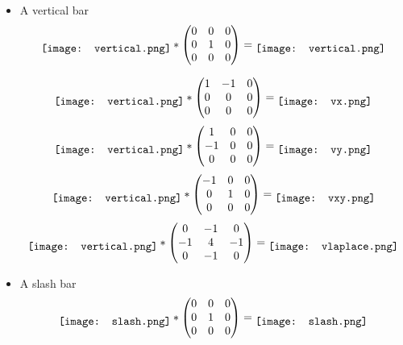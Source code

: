 \begin{itemize}
\item A vertical bar
$$
\raisebox{-.5\height}{\texttt{[image: vertical.png]}} *
\begin{pmatrix}
    0 & 0 & 0\\
    0 & 1 & 0\\
    0 & 0 & 0
\end{pmatrix} = 
\raisebox{-.5\height}{\texttt{[image: vertical.png]}} 
$$

$$
\raisebox{-.5\height}{\texttt{[image: vertical.png]}} *
\begin{pmatrix}
    1 & -1 & 0\\
    0 & 0 & 0\\
    0 & 0 & 0
\end{pmatrix} = 
\raisebox{-.5\height}{\texttt{[image: vx.png]}} 
$$
$$
\raisebox{-.5\height}{\texttt{[image: vertical.png]}} *
\begin{pmatrix}
    1 & 0 & 0\\
    -1 & 0 & 0\\
    0 & 0 & 0
\end{pmatrix} = 
\raisebox{-.5\height}{\texttt{[image: vy.png]}} 
$$
$$
\raisebox{-.5\height}{\texttt{[image: vertical.png]}} *
\begin{pmatrix}
    -1 & 0 & 0\\
    0 & 1 & 0\\
    0 & 0 & 0
\end{pmatrix} = 
\raisebox{-.5\height}{\texttt{[image: vxy.png]}} 
$$
$$
\raisebox{-.5\height}{\texttt{[image: vertical.png]}} *
\begin{pmatrix}
    0 & -1 & 0\\
    -1 & 4 & -1\\
    0 & -1 & 0
\end{pmatrix} = 
\raisebox{-.5\height}{\texttt{[image: vlaplace.png]}} 
$$

\item A slash bar
$$
\raisebox{-.5\height}{\texttt{[image: slash.png]}} *
\begin{pmatrix}
    0 & 0 & 0\\
    0 & 1 & 0\\
    0 & 0 & 0
\end{pmatrix} = 
\raisebox{-.5\height}{\texttt{[image: slash.png]}} 
$$


\end{itemize}
